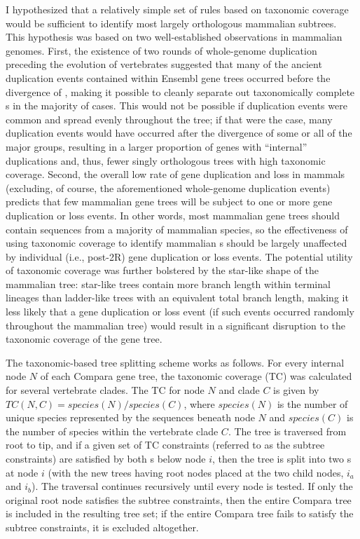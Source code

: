 I hypothesized that a relatively simple set of rules based on
taxonomic coverage would be sufficient to identify most largely
orthologous mammalian subtrees. This hypothesis was based on two
well-established observations in mammalian genomes. First, the
existence of two rounds of whole-genome duplication preceding the
evolution of vertebrates \citep{TODO} suggested that many of the
ancient duplication events contained within Ensembl gene trees
occurred before the divergence of \mmls, making it possible to cleanly
separate out taxonomically complete \mmln \subtr{}s in the majority of
cases. This would not be possible if duplication events were common
and spread evenly throughout the \mmln tree; if that were the case,
many duplication events would have occurred after the divergence of
some or all of the major \mmln groups, resulting in a larger
proportion of \mmln genes with ``internal'' duplications and, thus,
fewer singly orthologous trees with high taxonomic coverage. Second,
the overall low rate of gene duplication and loss in mammals
\citep{TODO, mammalian gene trees PLoS One} (excluding, of course, the
aforementioned whole-genome duplication events) predicts that few
mammalian gene trees will be subject to one or more gene duplication
or loss events. In other words, most mammalian gene trees should
contain sequences from a majority of mammalian species, so the
effectiveness of using taxonomic coverage to identify mammalian
\subtr{}s should be largely unaffected by individual (i.e., post-2R)
gene duplication or loss events. The potential utility of taxonomic
coverage was further bolstered by the star-like shape of the mammalian
tree: star-like trees contain more branch length within terminal
lineages than ladder-like trees with an equivalent total branch
length, making it less likely that a gene duplication or loss event
(if such events occurred randomly throughout the mammalian tree) would
result in a significant disruption to the taxonomic coverage of the
gene tree.

The taxonomic-based tree splitting scheme works as follows. For every
internal node $N$ of each Compara gene tree, the taxonomic coverage
(TC) was calculated for several vertebrate clades. The TC for node $N$
and clade $C$ is given by $TC(N,C) = species(N) / species(C) $, where
$species(N)$ is the number of unique species represented by the
sequences beneath node $N$ and $species(C)$ is the number of species
within the vertebrate clade $C$. The tree is traversed from root to
tip, and if a given set of TC constraints (referred to as the subtree
constraints) are satisfied by both \subtr{}s below node $i$, then the
tree is split into two \subtr{}s at node $i$ (with the new trees
having root nodes placed at the two child nodes, $i_a$ and $i_b$). The
traversal continues recursively until every node is tested. If only
the original root node satisfies the subtree constraints, then the
entire Compara tree is included in the resulting tree set; if the
entire Compara tree fails to satisfy the subtree constraints, it is
excluded altogether.

